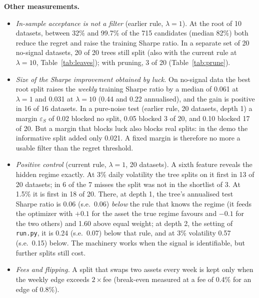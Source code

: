 \documentclass[11pt,a4paper]{article}
\newcommand{\1}{\mathbf{1}}
\begin{document}
\textbf{Other measurements.}
\begin{itemize}
\item \emph{In-sample acceptance is not a filter} (earlier rule, $\lambda=1$). At the root of 10 datasets, between 32\% and 99.7\% of the 715 candidates (median 82\%) both reduce the regret and raise the training Sharpe ratio. In a separate set of 20 no-signal datasets, 20 of 20 trees still split (also with the current rule at $\lambda=10$, Table~\ref{tab:leaves}); with pruning, 3 of 20 (Table~\ref{tab:prune}).
\item \emph{Size of the Sharpe improvement obtained by luck.} On no-signal data the best root split raises the \emph{weekly} training Sharpe ratio by a median of 0.061 at $\lambda=1$ and 0.031 at $\lambda=10$ (0.44 and 0.22 annualised), and the gain is positive in 16 of 16 datasets. In a pure-noise test (earlier rule, 20 datasets, depth 1) a margin $\varepsilon_S$ of 0.02 blocked no split, 0.05 blocked 3 of 20, and 0.10 blocked 17 of 20. But a margin that blocks luck also blocks real splits: in the demo the informative split added only 0.021. A fixed margin is therefore no more a usable filter than the regret threshold.
\item \emph{Positive control} (current rule, $\lambda=1$, 20 datasets). A sixth feature reveals the hidden regime exactly. At 3\% daily volatility the tree splits on it first in 13 of 20 datasets; in 6 of the 7 misses the split was not in the shortlist of 3. At 1.5\% it is first in 18 of 20. There, at depth 1, the tree's annualised test Sharpe ratio is 0.06 (s.e.\ 0.06) \emph{below} the rule that knows the regime (it feeds the optimizer with $+0.1$ for the asset the true regime favours and $-0.1$ for the two others) and 1.60 above equal weight; at depth 2, the setting of \texttt{run.py}, it is 0.24 (s.e.\ 0.07) below that rule, and at 3\% volatility 0.57 (s.e.\ 0.15) below. The machinery works when the signal is identifiable, but further splits still cost.
\item \emph{Fees and flipping.} A split that swaps two assets every week is kept only when the weekly edge exceeds $2\times$fee (break-even measured at a fee of 0.4\% for an edge of 0.8\%).
\end{itemize}
\end{document}
